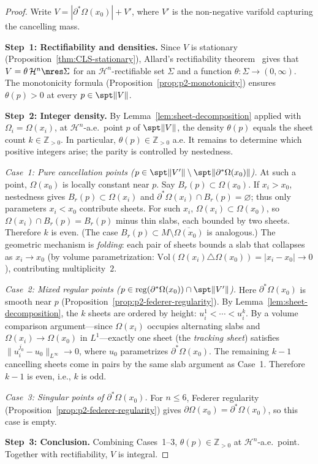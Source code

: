 \begin{proof}
Write $V = |\partial^*\Omega(x_0)| + V'$, where $V'$ is the non-negative varifold capturing the cancelling mass.

\medskip\noindent\textbf{Step~1: Rectifiability and densities.}
Since $V$ is stationary (Proposition~\ref{thm:CLS-stationary}), Allard's rectifiability theorem~\cite[Theorem~5.5(1)]{All72} gives that $V = \theta \, \mathcal{H}^n \mres \Sigma$ for an $\mathcal{H}^n$-rectifiable set $\Sigma$ and a function $\theta \colon \Sigma \to (0, \infty)$. The monotonicity formula (Proposition~\ref{prop:p2-monotonicity}) ensures $\theta(p) > 0$ at every $p \in \spt\|V\|$.

\medskip\noindent\textbf{Step~2: Integer density.}
By Lemma~\ref{lem:sheet-decomposition} applied with $\Omega_i = \Omega(x_i)$, at $\mathcal{H}^n$-a.e.\ point $p$ of $\spt\|V\|$, the density $\theta(p)$ equals the sheet count $k \in \mathbb{Z}_{>0}$. In particular, $\theta(p) \in \mathbb{Z}_{>0}$ a.e. It remains to determine which positive integers arise; the parity is controlled by nestedness.

\medskip\noindent\emph{Case~1: Pure cancellation points ($p \in \spt\|V'\| \setminus \spt\|\partial^*\Omega(x_0)\|$).}
At such a point, $\Omega(x_0)$ is locally constant near $p$. Say $B_r(p) \subset \Omega(x_0)$. If $x_i > x_0$, nestedness gives $B_r(p) \subset \Omega(x_i)$ and $\partial^*\Omega(x_i) \cap B_r(p) = \varnothing$; thus only parameters $x_i < x_0$ contribute sheets. For such $x_i$, $\Omega(x_i) \subset \Omega(x_0)$, so $\Omega(x_i) \cap B_r(p) = B_r(p)$ minus thin slabs, each bounded by two sheets. Therefore $k$ is even. (The case $B_r(p) \subset M \setminus \overline{\Omega(x_0)}$ is analogous.) The geometric mechanism is \emph{folding}: each pair of sheets bounds a slab that collapses as $x_i \to x_0$ (by volume parametrization: $\mathrm{Vol}(\Omega(x_i) \triangle \Omega(x_0)) = |x_i - x_0| \to 0$), contributing multiplicity~$2$.

\medskip\noindent\emph{Case~2: Mixed regular points ($p \in \mathrm{reg}(\partial^*\Omega(x_0)) \cap \spt\|V'\|$).}
Here $\partial^*\Omega(x_0)$ is smooth near $p$ (Proposition~\ref{prop:p2-federer-regularity}). By Lemma~\ref{lem:sheet-decomposition}, the $k$ sheets are ordered by height: $u_i^1 < \cdots < u_i^k$. By a volume comparison argument---since $\Omega(x_i)$ occupies alternating slabs and $\Omega(x_i) \to \Omega(x_0)$ in $L^1$---exactly one sheet (the \emph{tracking sheet}) satisfies $\|u_i^{j_0} - u_0\|_{L^\infty} \to 0$, where $u_0$ parametrizes $\partial^*\Omega(x_0)$. The remaining $k - 1$ cancelling sheets come in pairs by the same slab argument as Case~1. Therefore $k - 1$ is even, i.e., $k$ is odd.

\medskip\noindent\emph{Case~3: Singular points of $\partial^*\Omega(x_0)$.}
For $n \leq 6$, Federer regularity (Proposition~\ref{prop:p2-federer-regularity}) gives $\partial\Omega(x_0) = \partial^*\Omega(x_0)$, so this case is empty.

\medskip\noindent\textbf{Step~3: Conclusion.}
Combining Cases~1--3, $\theta(p) \in \mathbb{Z}_{>0}$ at $\mathcal{H}^n$-a.e.\ point. Together with rectifiability, $V$ is integral.
\end{proof}

